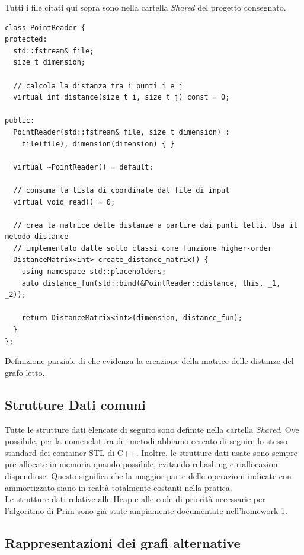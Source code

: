 Tutti i file citati qui sopra sono nella cartella \textit{Shared} del progetto consegnato.

\begin{listing}[!ht]
\begin{verbatim}
class PointReader {
protected:
  std::fstream& file;
  size_t dimension;

  // calcola la distanza tra i punti i e j
  virtual int distance(size_t i, size_t j) const = 0;

public:
  PointReader(std::fstream& file, size_t dimension) :
    file(file), dimension(dimension) { }

  virtual ~PointReader() = default;

  // consuma la lista di coordinate dal file di input
  virtual void read() = 0;

  // crea la matrice delle distanze a partire dai punti letti. Usa il metodo distance
  // implementato dalle sotto classi come funzione higher-order
  DistanceMatrix<int> create_distance_matrix() {
    using namespace std::placeholders;
    auto distance_fun(std::bind(&PointReader::distance, this, _1, _2));

    return DistanceMatrix<int>(dimension, distance_fun);
  }
};
\end{verbatim}
\caption{Definizione parziale di  che evidenza la creazione della matrice delle distanze del grafo letto.}
\label{listing:point-reader}
\end{listing}

\subsection{Strutture Dati comuni}

Tutte le strutture dati elencate di seguito sono definite nella cartella \textit{Shared}.
Ove possibile, per la nomenclatura dei metodi abbiamo cercato di seguire lo stesso standard dei container STL di C++.
Inoltre, le strutture dati usate sono sempre pre-allocate in memoria quando possibile, evitando rehashing e riallocazioni dispendiose. Questo significa che la maggior parte delle operazioni indicate con \complexityConstant{} ammortizzato siano in realtà totalmente costanti nella pratica. \\

\noindent Le strutture dati relative alle Heap e alle code di priorità necessarie per l'algoritmo di Prim sono già state ampiamente documentate nell'homework 1.

\subsection{Rappresentazioni dei grafi alternative}

